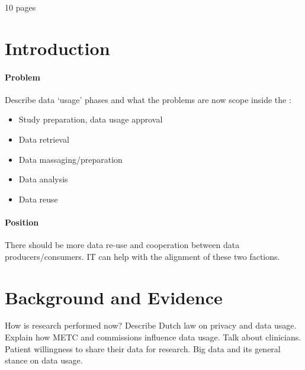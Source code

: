 10 pages

\section{Introduction}
\paragraph{Problem}
Describe data `usage' phases and what the problems are now scope inside the \project{}:
\begin{itemize}
	\item Study preparation, data usage approval
	\item Data retrieval
	\item Data massaging/preparation
	\item Data analysis
	\item Data reuse
\end{itemize}
\paragraph{Position}
There should be more data re-use and cooperation between data producers/consumers.
IT can help with the alignment of these two factions.

\section{Background and Evidence}
How is research performed now?
Describe Dutch law on privacy and data usage.
Explain how METC and commissions influence data usage.
Talk about clinicians.
Patient willingness to share their data for research.
Big data and its general stance on data usage.

